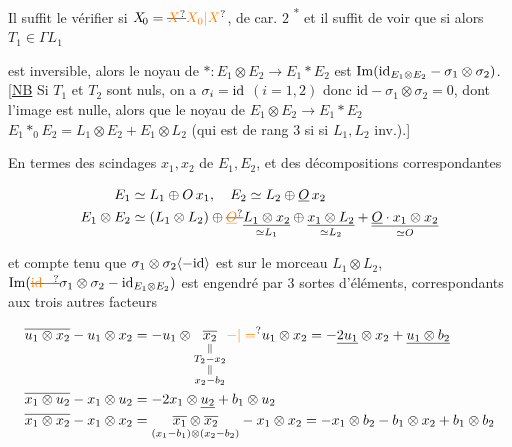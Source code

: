 Il suffit le vérifier  si $X_{\!0}=\deleted{\unsure{X}}\unsure{X_0|X}$, de car. $2$ \textsuperscript{*} et il suffit de voir que si alors $T_1\in\Gamma L_1$


est inversible, alors le noyau de $*:E_1\otimes E_2\longrightarrow E_1*E_2$ est $\operatorname{Im}({\rm id}_{E_1\otimes E_2}-\sigma_1\otimes\sigma_2)$. [\uline{NB} Si $T_1$ et $T_2$ sont nuls, on a $\sigma_i={\rm id}$ $(i=1,2)$ donc $\mathrm{id}-\sigma_1\otimes\sigma_2=0$,
dont l'image est nulle, alors que le noyau de $E_1\otimes E_2\longrightarrow E_1*E_2$    $E_1*_{0}E_2=L_1\otimes E_2+E_1\otimes L_2$ (qui est de rang $3$ si si $L_1,L_2$ inv.).]

En termes des scindages $x_1,x_2$ de $E_1,E_2$, et des  décompositions correspondantes

\[ \begin{aligned} E_1&\simeq L_1\oplus O\,x_1,\quad E_2\simeq L_2\oplus\underline O\,x_2\\ E_1\otimes E_2&\simeq(L_1\otimes L_2)\oplus\deleted{\unsure{\underline O}}\underset{\simeq L_1}{\underline{L_1\otimes x_2}}\oplus\underset{\simeq L_2}{\underline{x_1\otimes L_2}}+\underset{\simeq O}{\underline{\underline O\cdot x_1\otimes x_2}} \end{aligned} \]

et compte tenu que $\sigma_1\otimes\sigma_2\inserted{-{\rm id}}$ est   sur le morceau $L_1\otimes L_2$,  $\operatorname{Im}(\deleted{\unsure{{\rm id}-}}\sigma_1\otimes\sigma_2-{\rm id}_{E_1\otimes E_2})$ est engendré par $3$ sortes d'éléments, correspondants aux trois autres facteurs

\[ \begin{aligned} \overline{u_1\otimes x_2}-u_1\otimes x_2&=-u_1\otimes\underset{\substack{\Vert\\T_2-x_2\\\Vert\\x_2-b_2}}{\overline{x_2}}\unsure{-|=}u_1\otimes x_2=-\underline{2u_1}\otimes x_2+\underline{u_1\otimes b_2}\\ \overline{x_1\otimes u_2}-x_1\otimes u_2&=-2x_1\otimes\underline{u_2}+b_1\otimes u_2\\ \overline{x_1\otimes x_2}-x_1\otimes x_2&=\underset{(x_1-b_1)\otimes(x_2-b_2)}{\overline{x_1}\otimes\overline{x_2}}-x_1\otimes x_2=-x_1\otimes b_2-b_1\otimes x_2+b_1\otimes b_2 \end{aligned} \]

